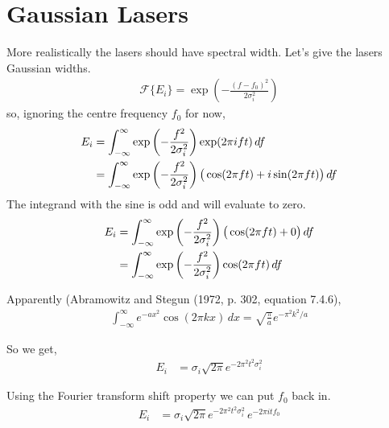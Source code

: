 \section{Gaussian Lasers}
More realistically the lasers should have spectral width. Let's give the lasers Gaussian widths.
\begin{align}
\mathcal{F}\{E_i\} = \exp\left(-\frac{(f-f_0)^2}{2\sigma_i^2}\right)
\end{align}
so, ignoring the centre frequency $f_0$ for now,
\begin{align}
E_i &= \int_{-\infty}^{\infty} \exp\left(-\frac{f^2}{2\sigma_i^2}\right) \exp(2\pi i f t) \,df\notag\\
&= \int_{-\infty}^{\infty} \exp\left(-\frac{f^2}{2\sigma_i^2}\right) \big(\cos(2\pi f t) + i\sin(2\pi f t)\big) \,df
\end{align}
The integrand with the sine is odd and will evaluate to zero.
\begin{align}
E_i &= \int_{-\infty}^{\infty} \exp\left(-\frac{f^2}{2\sigma_i^2}\right) \big(\cos(2\pi f t) + 0\big) \,df \notag\\
&= \int_{-\infty}^{\infty} \exp\left(-\frac{f^2}{2\sigma_i^2}\right)\cos(2\pi f t) \,df
\end{align}

Apparently (Abramowitz and Stegun (1972, p. 302, equation 7.4.6),
\begin{align}
\int_{-\infty}^{\infty}e^{-ax^2}\cos(2\pi k x)\,dx = \sqrt{\frac{\pi}{a}} e^{-\pi^2k^2/a}
\end{align}

So we get,
\begin{align}
E_i &= \sigma_i\sqrt{2 \pi} e^{-2 \pi^2t^2 \sigma_i^2}
\end{align}

Using the Fourier transform shift property we can put $f_0$ back in.
\begin{align}
E_i &= \sigma_i\sqrt{2 \pi} e^{-2 \pi^2t^2 \sigma_i^2}\,e^{-2\pi i t f_0}
\end{align}

